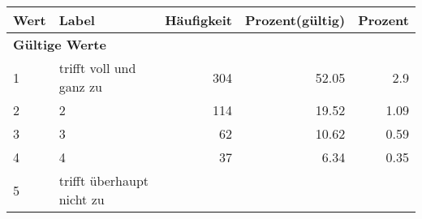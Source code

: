     \begin{longtable}{lXrrr}
     \toprule
     \textbf{Wert} & \textbf{Label} & \textbf{Häufigkeit} & \textbf{Prozent(gültig)} & \textbf{Prozent} \\
     \endhead
     \midrule
     \multicolumn{5}{l}{\textbf{Gültige Werte}}\\

     1 &
     \multicolumn{1}{X}{ trifft voll und ganz zu   } &


       \num{304} &
       \num[round-mode=places,round-precision=2]{52.05} &
         \num[round-mode=places,round-precision=2]{2.9} \\

     2 &
     \multicolumn{1}{X}{ 2   } &


       \num{114} &
       \num[round-mode=places,round-precision=2]{19.52} &
         \num[round-mode=places,round-precision=2]{1.09} \\

     3 &
     \multicolumn{1}{X}{ 3   } &


       \num{62} &
       \num[round-mode=places,round-precision=2]{10.62} &
         \num[round-mode=places,round-precision=2]{0.59} \\

     4 &
     \multicolumn{1}{X}{ 4   } &


       \num{37} &
       \num[round-mode=places,round-precision=2]{6.34} &
         \num[round-mode=places,round-precision=2]{0.35} \\

     5 &
     \multicolumn{1}{X}{ trifft überhaupt nicht zu   } &



\end{longtable}

